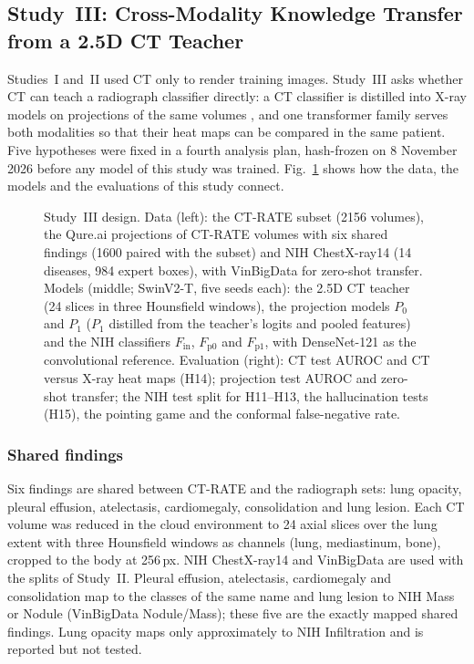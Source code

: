 \subsection{Study~III: Cross-Modality Knowledge Transfer from a 2.5D CT Teacher}
\label{sec:m-study3}
Studies~I and~II used CT only to render training images. Study~III asks whether CT can teach a radiograph classifier directly: a CT
classifier is distilled \cite{hinton2015distilling} into X-ray models on projections of the same volumes \cite{angaitkar2026anatomy}, and one
transformer family serves both modalities so that their heat maps can be compared in the same patient. Five hypotheses were fixed in a
fourth analysis plan, hash-frozen on 8 November 2026 before any model of this study was trained. Fig.~\ref{fig:xm_design} shows how the
data, the models and the evaluations of this study connect.

\begin{figure}[!t]
\centering
{}
\caption{Study~III design. Data (left): the CT-RATE subset (\num{2156} volumes), the Qure.ai projections of CT-RATE volumes with six
shared findings (\num{1600} paired with the subset) and NIH ChestX-ray14 (14 diseases, 984 expert boxes), with VinBigData for zero-shot
transfer. Models (middle; SwinV2-T, five seeds each): the 2.5D CT teacher (24 slices in three Hounsfield windows), the projection models
$P_0$ and $P_1$ ($P_1$ distilled from the teacher's logits and pooled features) and the NIH classifiers $F_{\mathrm{in}}$,
$F_{\mathrm{p0}}$ and $F_{\mathrm{p1}}$, with DenseNet-121 as the convolutional reference. Evaluation (right): CT test AUROC and CT versus
X-ray heat maps (H14); projection test AUROC and zero-shot transfer; the NIH test split for H11--H13, the hallucination tests (H15), the
pointing game and the conformal false-negative rate.}
\label{fig:xm_design}
\end{figure}

\subsubsection{Shared findings}
Six findings are shared between CT-RATE and the radiograph sets: lung opacity, pleural effusion, atelectasis, cardiomegaly, consolidation
and lung lesion. Each CT volume was reduced in the cloud environment to 24 axial slices over the lung extent with three Hounsfield windows
as channels (lung, mediastinum, bone), cropped to the body at 256\,px. NIH ChestX-ray14 and VinBigData are used with the splits of
Study~II. Pleural effusion, atelectasis, cardiomegaly and consolidation map to the classes of the same name and lung lesion to NIH Mass or
Nodule (VinBigData Nodule/Mass); these five are the exactly mapped shared findings. Lung opacity maps only approximately to NIH Infiltration
and is reported but not tested.


